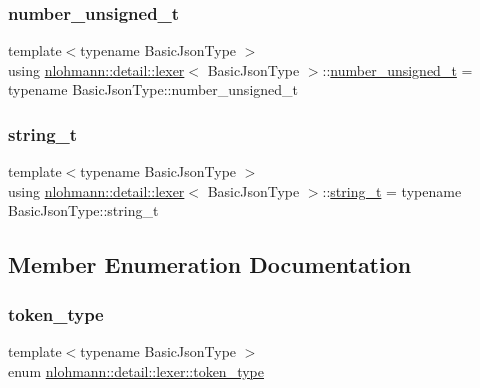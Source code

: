 \subsubsection{\texorpdfstring{number\_unsigned\_t}{number\_unsigned\_t}}
{\footnotesize\ttfamily template$<$typename Basic\+Json\+Type $>$ \\
using \mbox{\hyperlink{classnlohmann_1_1detail_1_1lexer}{nlohmann\+::detail\+::lexer}}$<$ Basic\+Json\+Type $>$\+::\mbox{\hyperlink{classnlohmann_1_1detail_1_1lexer_a105d1dfeab414a572655895cdd96a52a}{number\+\_\+unsigned\+\_\+t}} =  typename Basic\+Json\+Type\+::number\+\_\+unsigned\+\_\+t\hspace{0.3cm}{\ttfamily [private]}}

\mbox{\label{classnlohmann_1_1detail_1_1lexer_ab63d35c658887592a4b09ad26eb4c795}} 
\subsubsection{\texorpdfstring{string\_t}{string\_t}}
{\footnotesize\ttfamily template$<$typename Basic\+Json\+Type $>$ \\
using \mbox{\hyperlink{classnlohmann_1_1detail_1_1lexer}{nlohmann\+::detail\+::lexer}}$<$ Basic\+Json\+Type $>$\+::\mbox{\hyperlink{classnlohmann_1_1detail_1_1lexer_ab63d35c658887592a4b09ad26eb4c795}{string\+\_\+t}} =  typename Basic\+Json\+Type\+::string\+\_\+t\hspace{0.3cm}{\ttfamily [private]}}



\subsection{Member Enumeration Documentation}
\mbox{\label{classnlohmann_1_1detail_1_1lexer_a3f313cdbe187cababfc5e06f0b69b098}} 
\subsubsection{\texorpdfstring{token\_type}{token\_type}}
{\footnotesize\ttfamily template$<$typename Basic\+Json\+Type $>$ \\
enum \mbox{\hyperlink{classnlohmann_1_1detail_1_1lexer_a3f313cdbe187cababfc5e06f0b69b098}{nlohmann\+::detail\+::lexer\+::token\+\_\+type}}\hspace{0.3cm}{\ttfamily [strong]}}




